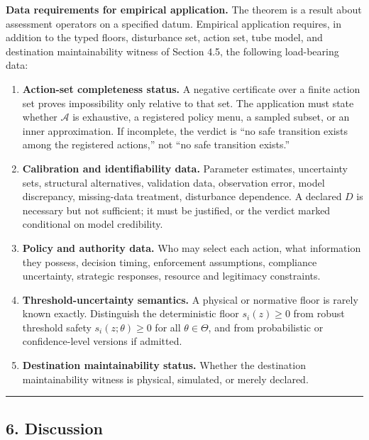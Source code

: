 \documentclass[11pt]{article}
\providecommand{\tightlist}{\setlength{\itemsep}{0pt}\setlength{\parskip}{0pt}}
\begin{document}
\textbf{Data requirements for empirical application.} The theorem is a
result about assessment operators on a specified datum. Empirical
application requires, in addition to the typed floors, disturbance set,
action set, tube model, and destination maintainability witness of
Section 4.5, the following load-bearing data:

\begin{enumerate}
\def\labelenumi{\arabic{enumi}.}
\tightlist
\item
  \textbf{Action-set completeness status.} A negative certificate over a
  finite action set proves impossibility only relative to that set. The
  application must state whether \(\mathcal{A}\) is exhaustive, a
  registered policy menu, a sampled subset, or an inner approximation.
  If incomplete, the verdict is ``no safe transition exists among the
  registered actions,'' not ``no safe transition exists.''
\item
  \textbf{Calibration and identifiability data.} Parameter estimates,
  uncertainty sets, structural alternatives, validation data,
  observation error, model discrepancy, missing-data treatment,
  disturbance dependence. A declared \(D\) is necessary but not
  sufficient; it must be justified, or the verdict marked conditional on
  model credibility.
\item
  \textbf{Policy and authority data.} Who may select each action, what
  information they possess, decision timing, enforcement assumptions,
  compliance uncertainty, strategic responses, resource and legitimacy
  constraints.
\item
  \textbf{Threshold-uncertainty semantics.} A physical or normative
  floor is rarely known exactly. Distinguish the deterministic floor
  \(s_i(z) \ge 0\) from robust threshold safety \(s_i(z;\theta) \ge 0\)
  for all \(\theta \in \Theta\), and from probabilistic or
  confidence-level versions if admitted.
\item
  \textbf{Destination maintainability status.} Whether the destination
  maintainability witness is physical, simulated, or merely declared.
\end{enumerate}

\begin{center}\rule{0.5\linewidth}{0.5pt}\end{center}

\subsection{6. Discussion}\label{discussion}
\end{document}
